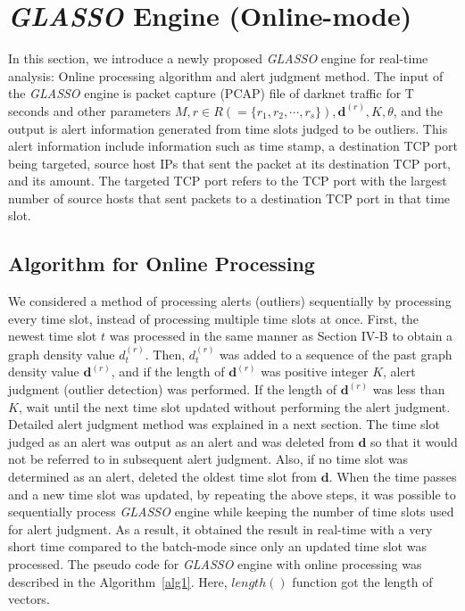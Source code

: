 \documentclass[conference]{IEEEtran}
\begin{document}
\section{{\it GLASSO} Engine (Online-mode)}
In this section, we introduce a newly proposed {\it GLASSO} engine for real-time analysis: Online processing algorithm and alert judgment method.
The input of the {\it GLASSO} engine is packet capture (PCAP) file of darknet traffic for T seconds and other parameters $M, r \in R ( = \{r_1, r_2, \cdots, r_s\} ), \bm{d}^{(r)}, K, \theta$, and the output is alert information generated from time slots judged to be outliers.
This alert information include information such as time stamp, a destination TCP port being targeted, source host IPs that sent the packet at its destination TCP port, and its amount.
The targeted TCP port refers to the TCP port with the largest number of source hosts that sent packets to a destination TCP port in that time slot.






\subsection{Algorithm for Online Processing}
We considered a method of processing alerts (outliers) sequentially by processing every time slot, instead of processing multiple time slots at once.
First, the newest time slot $t$ was processed in the same manner as Section I\hspace{-.1em}V-B to obtain a graph density value $d_t^{(r)}$.
Then, $d_t^{(r)}$ was added to a sequence of the past graph density value $\bm{d}^{(r)}$, and if the length of $\bm{d}^{(r)}$ was positive integer $K$, alert judgment (outlier detection) was performed.
If the length of $\bm{d}^{(r)}$ was less than $K$, wait until the next time slot updated without performing the alert judgment.
Detailed alert judgment method was explained in a next section.
The time slot judged as an alert was output as an alert and was deleted from $\bm{d}$ so that it would not be referred to in subsequent alert judgment.
Also, if no time slot was determined as an alert, deleted the oldest time slot from $\bm{d}$.
When the time passes and a new time slot was updated, by repeating the above steps, it was possible to sequentially process {\it GLASSO} engine while keeping the number of time slots used for alert judgment.
As a result, it obtained the result in real-time with a very short time compared to the batch-mode since only an updated time slot was processed.
The pseudo code for {\it GLASSO} engine with online processing was described in the Algorithm~\ref{alg1}.
Here, $length()$ function got the length of vectors.
\end{document}
